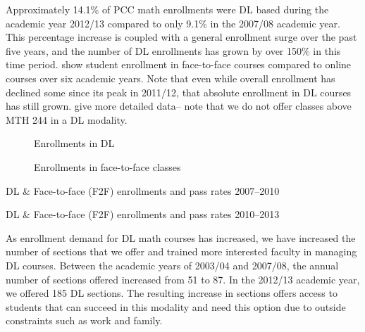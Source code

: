 Approximately 14.1\% of PCC math enrollments were DL based during the
academic year 2012/13 compared to only 9.1\% in the 2007/08 academic year.
This percentage increase is coupled with a general enrollment surge over the
past five years, and the number of DL enrollments has grown by over 150\% in
this time period.  show
student enrollment in face-to-face courses compared to online courses over six
academic years. Note that even while overall enrollment has declined some since
its peak in 2011/12, that absolute enrollment in DL courses has still grown.
 give more detailed data-- 
note that we do not offer classes above MTH 244 in a DL modality.

\begin{figure}[!htb]
    \begin{minipage}{.5\textwidth}
          
          \caption{Enrollments in DL}\label{fig:sec3:DLenrollments}
    \end{minipage}%
    \begin{minipage}{.5\textwidth}
          
          \caption{Enrollments in face-to-face classes}\label{fig:sec3:F2Fenrollments}
    \end{minipage}
\end{figure}

\begin{table}[!htb]
	\begin{widepage}
	\centering
  	\caption{DL \& Face-to-face (F2F) enrollments and pass rates 2007--2010}
    \label{tab:sec3:F2FandDLdata2007}
          
          \vspace{2pc}
  	\caption{DL \& Face-to-face (F2F) enrollments and pass rates 2010--2013}
    \label{tab:sec3:F2FandDLdata2010}
          
          \end{widepage}
\end{table}

As enrollment demand for DL math courses has increased, we have increased the
number of sections that we offer and trained more interested faculty in managing
DL courses.  Between the academic years of 2003/04 and 2007/08, the annual
number of sections offered increased from 51 to 87.  In the 2012/13 academic
year, we offered 185 DL sections.   The resulting increase in sections offers
access to students that can succeed in this modality and need this option due to
outside constraints such as work and family.


